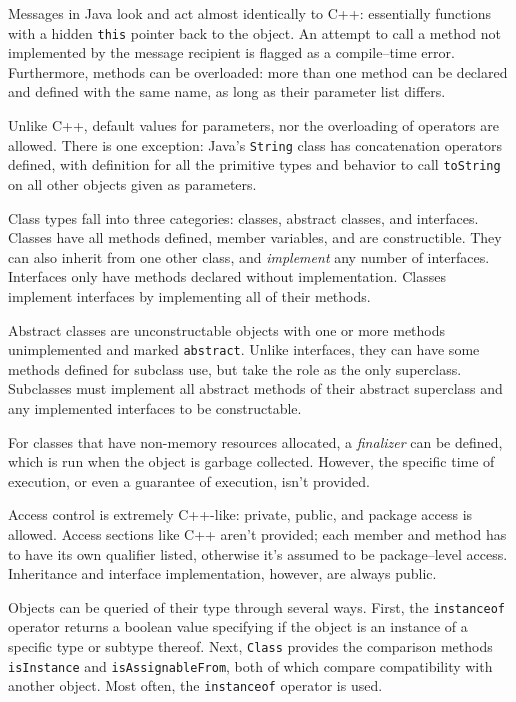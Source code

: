 Messages in Java look and act almost identically to C++: essentially functions
with a hidden \texttt{this} pointer back to the object. An attempt to call a
method not implemented by the message recipient is flagged as a compile--time
error. Furthermore, methods can be overloaded: more than one method can be
declared and defined with the same name, as long as their parameter list
differs.

Unlike C++, default values for parameters, nor the overloading of operators
are allowed. There is one exception: Java's \texttt{String} class has
concatenation operators defined, with definition for all the primitive types
and behavior to call \texttt{toString} on all other objects given as
parameters.

Class types fall into three categories: classes, abstract classes, and
interfaces. Classes have all methods defined, member variables, and are
constructible. They can also inherit from one other class, and
\emph{implement} any number of interfaces. Interfaces only have methods
declared without implementation. Classes implement interfaces by implementing
all of their methods.

Abstract classes are unconstructable objects with one or more methods
unimplemented and marked \texttt{abstract}. Unlike interfaces, they can have
some methods defined for subclass use, but take the role as the only
superclass. Subclasses must implement all abstract methods of their abstract
superclass and any implemented interfaces to be constructable.

For classes that have non-memory resources allocated, a \emph{finalizer} can
be defined, which is run when the object is garbage collected. However, the
specific time of execution, or even a guarantee of execution, isn't provided.

Access control is extremely C++-like: private, public, and package access is
allowed. Access sections like C++ aren't provided; each member and method has
to have its own qualifier listed, otherwise it's assumed to be package--level
access. Inheritance and interface implementation, however, are always public.

Objects can be queried of their type through several ways. First, the
\texttt{instanceof} operator returns a boolean value specifying if the object
is an instance of a specific type or subtype thereof. Next, \texttt{Class}
provides the comparison methods \texttt{isInstance} and
\texttt{isAssignableFrom}, both of which compare compatibility with another
object. Most often, the \texttt{instanceof} operator is used.

